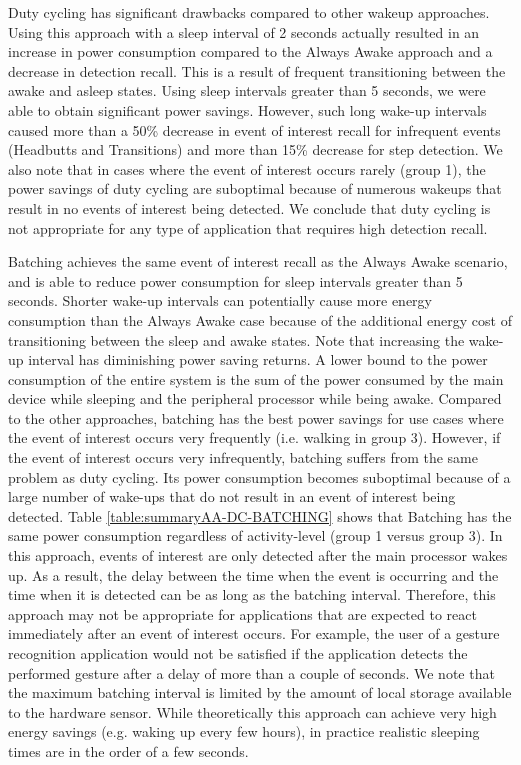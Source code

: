 Duty cycling has significant drawbacks compared to other wakeup approaches. Using this approach with a sleep interval of 2 seconds actually resulted in an increase in power consumption compared to the Always Awake approach and a decrease in detection recall. This is a result of frequent transitioning between the awake and asleep states. Using sleep intervals greater than 5 seconds, we were able to obtain significant power savings. However, such long wake-up intervals caused more than a 50\% decrease in event of interest recall for infrequent events (Headbutts and Transitions) and more than 15\% decrease for step detection. We also note that in cases where the event of interest occurs rarely (group 1), the power savings of duty cycling are suboptimal because of numerous wakeups that result in no events of interest being detected. We conclude that duty cycling is not appropriate for any type of application that requires high detection recall.

Batching achieves the same event of interest recall as the Always Awake scenario, and is able to reduce power consumption for sleep intervals greater than 5 seconds. Shorter wake-up intervals can potentially cause more energy consumption than the Always Awake case because of the additional energy cost of transitioning between the sleep and awake states. Note that increasing the wake-up interval has diminishing power saving returns. A lower bound to the power consumption of the entire system is the sum of the power consumed by the main device while sleeping and the peripheral processor while being awake. Compared to the other approaches, batching has the best power savings for use cases where the event of interest occurs very frequently (i.e. walking in group 3). However, if the event of interest occurs very infrequently, batching suffers from the same problem as duty cycling. Its power consumption becomes suboptimal because of a large number of wake-ups that do not result in an event of interest being detected. Table \ref{table:summaryAA-DC-BATCHING} shows that Batching has the same power consumption regardless of activity-level (group 1 versus group 3). In this approach, events of interest are only detected after the main processor wakes up. As a result, the delay between the time when the event is occurring and the time when it is detected can be as long as the batching interval. Therefore, this approach may not be appropriate for applications that are expected to react immediately after an event of interest occurs. For example, the user of a gesture recognition application would not be satisfied if the application detects the performed gesture after a delay of more than a couple of seconds. We note that the maximum batching interval is limited by the amount of local storage available to the hardware sensor. While theoretically this approach can achieve very high energy savings (e.g. waking up every few hours), in practice realistic sleeping times are in the order of a few seconds.

